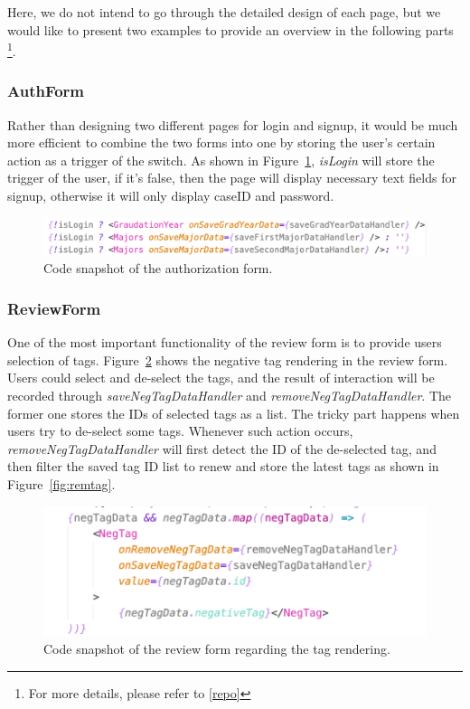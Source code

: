 \documentclass[12pt]{article}
\begin{document}
Here, we do not intend to go through the detailed design of each page, but we would like to present two examples to provide an overview in the following parts 
\footnote{For more details, please refer to \ref{repo}}. 
\subsubsection{AuthForm}
Rather than designing two different pages for login and signup, it would be much more efficient to combine the two forms into one by storing 
the user's certain action as a trigger of the switch. As shown in Figure~\ref{fig:authf}, \textit{isLogin} will store the trigger of the user, 
if it's false, then the page will display necessary text fields for signup, otherwise it will only display caseID and password.

\begin{figure}[h]
    \centering
    \label{fig:authf}
    \includegraphics[scale=0.6]{auth-form.png}
    \caption{Code snapshot of the authorization form.}
\end{figure}

\subsubsection{ReviewForm}
One of the most important functionality of the review form is to provide users selection of tags. 
Figure~\ref{fig:tagren} shows the negative tag rendering in the review form. Users could select and de-select 
the tags, and the result of interaction will be recorded through \textit{saveNegTagDataHandler} and \textit{removeNegTagDataHandler}. 
The former one stores the IDs of selected tags as a list. The tricky part happens when users try to de-select some tags. 
Whenever such action occurs, \textit{removeNegTagDataHandler} will first detect the ID of the de-selected tag, and then filter the saved 
tag ID list to renew and store the latest tags as shown in Figure~\ref{fig:remtag}.
\begin{figure}[h]
    \centering
    \label{fig:tagren}
    \includegraphics[scale=0.6]{tag-render.png}
    \caption{Code snapshot of the review form regarding the tag rendering.}
\end{figure}
\end{document}
